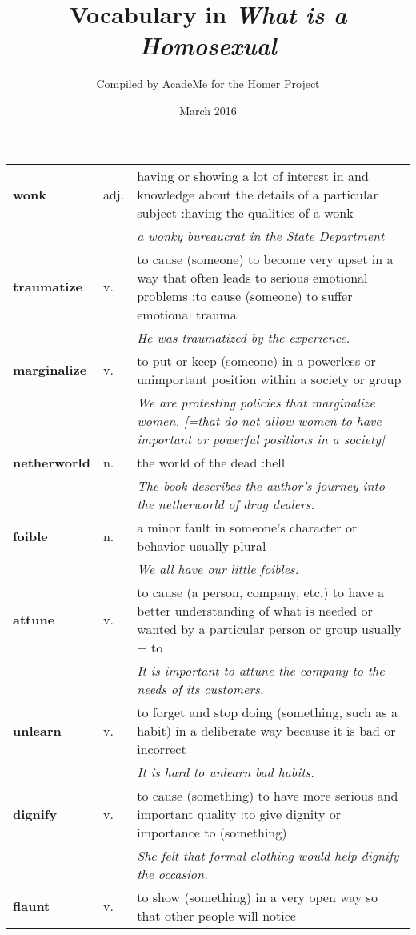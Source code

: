 \documentclass[a4paper]{article}
\title{Vocabulary in \textit{What is a Homosexual}}
\author{Compiled by AcadeMe for the Homer Project}
\date{March 2016}
\begin{document}
\maketitle
\begin{longtable}{llp{11cm}}
\textbf{wonk} & adj. &  having or showing a lot of interest in and knowledge about the details of a particular subject :having the qualities of a wonk \\
 & & \textit{a wonky bureaucrat in the State Department}\\[0.08cm]
\textbf{traumatize} & v. &  to cause (someone) to become very upset in a way that often leads to serious emotional problems :to cause (someone) to suffer emotional trauma \\
 & & \textit{He was traumatized by the experience.}\\[0.08cm]
\textbf{marginalize} & v. &  to put or keep (someone) in a powerless or unimportant position within a society or group \\
 & & \textit{We are protesting policies that marginalize women. [=that do not allow women to have important or powerful positions in a society]}\\[0.08cm]
\textbf{netherworld} & n. &  the world of the dead :hell\\
 & & \textit{The book describes the author's journey into the netherworld of drug dealers.}\\[0.08cm]
\textbf{foible} & n. &  a minor fault in someone's character or behavior usually plural \\
 & & \textit{We all have our little foibles.}\\[0.08cm]
\textbf{attune} & v. &  to cause (a person, company, etc.) to have a better understanding of what is needed or wanted by a particular person or group usually + to \\
 & & \textit{It is important to attune the company to the needs of its customers.}\\[0.08cm]
\textbf{unlearn} & v. &  to forget and stop doing (something, such as a habit) in a deliberate way because it is bad or incorrect \\
 & & \textit{It is hard to unlearn bad habits.}\\[0.08cm]
\textbf{dignify} & v. &  to cause (something) to have more serious and important quality :to give dignity or importance to (something) \\
 & & \textit{She felt that formal clothing would help dignify the occasion.}\\[0.08cm]
\textbf{flaunt} & v. &  to show (something) in a very open way so that other people will notice \\

\end{longtable}
\end{document}
